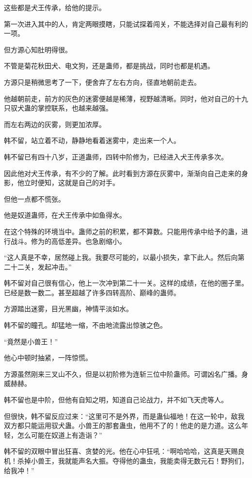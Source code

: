 \begin{this_body}
这些都是犬王传承，给他的提示。

第一次进入其中的人，肯定两眼摸瞎，只能试探着闯关，不能选择对自己最有利的一项。

但方源心知肚明得很。

不管是菊花秋田犬、电文狗，还是蛊师，都是挑战，同时也都是机遇。

方源只是稍微思考了一下，便舍弃了左右方向，径直地朝前走去。

他越朝前走，前方的灰色的迷雾便越是稀薄，视野越清晰。同时，他对自己的十九只驭犬蛊的掌控联系，也越来越强。

而左右两边的灰雾，则更加浓厚。

韩不留，站立着不动，静静地看着迷雾中，走出来一个人。

韩不留已有四十八岁，正道蛊师，四转中阶修为，已经进入犬王传承多次。

因此他对犬王传承，有不少的了解。此时看到方源在灰雾中，渐渐向自己走来的身影，他立时便知，这就是自己的对手。

但他一点都不慌张。

他是奴道蛊师，在犬王传承中如鱼得水。

在这个特殊的环境当中。蛊师之前的积累，都不算数。只能用传承中给予的蛊，进行战斗。修为的高低差异。也急剧缩小。

“这人真是不幸，居然碰上我。我要尽可能的，以最小损失，拿下此人。然后向第二十二关，发起冲击。”

韩不留对自己很有信心，他上一次冲到第二十一关。这样的成绩，在他的圈子里。已经是数一数二。甚至超越了许多四转高阶、巅峰的蛊师。

方源踏出迷雾，目光黑幽，神情平淡如水。

韩不留的瞳孔。却猛地一缩，不由地流露出惊骇之色。

“竟然是小兽王！”

他心中顿时抽紧，一阵惊慌。

方源虽然刚来三叉山不久，但是以初阶修为连斩三位中阶蛊师。可谓凶名广播。身威赫赫。

韩不留也是中阶，但他有自知之明，知道自己论战力，并不如飞天虎等人。

但很快，韩不留反应过来：“这里可不是外界，而是蛊仙福地！在这一轮中，敌我双方都只能运用驭犬蛊。小兽王的那套蛊虫，他用不了的！他走的是力道。这么年轻，怎么可能在奴道上有造诣？”

韩不留的双眼中冒出狂喜、贪婪的光。他在心中狂吼：“啊哈哈哈，这真是天赐良机！杀掉小兽王，我就能声名大振。夺得他的蛊虫，我能卖得无数元石！野狗们，给我冲！”


\end{this_body}
